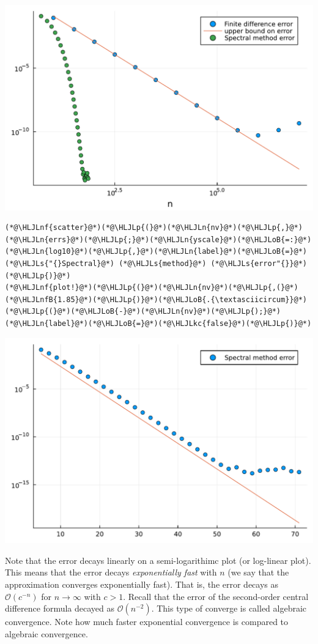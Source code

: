 \documentclass[12pt,a4paper]{article}
\newcommand{\HLJLkc}[1]{\textcolor[RGB]{59,151,46}{\textit{#1}}}
\newcommand{\HLJLn}[1]{#1}
\newcommand{\HLJLnf}[1]{\textcolor[RGB]{66,102,213}{#1}}
\newcommand{\HLJLs}[1]{\textcolor[RGB]{201,61,57}{#1}}
\newcommand{\HLJLnfB}[1]{\textcolor[RGB]{59,151,46}{#1}}
\newcommand{\HLJLoB}[1]{\textcolor[RGB]{102,102,102}{\textbf{#1}}}
\newcommand{\HLJLp}[1]{#1}
\begin{document}
\includegraphics[width=\linewidth]{jl_q9oYGN/Chapter1_4_1.pdf}

\begin{lstlisting}
(*@\HLJLnf{scatter}@*)(*@\HLJLp{(}@*)(*@\HLJLn{nv}@*)(*@\HLJLp{,}@*)(*@\HLJLn{errs}@*)(*@\HLJLp{;}@*)(*@\HLJLn{yscale}@*)(*@\HLJLoB{=:}@*)(*@\HLJLn{log10}@*)(*@\HLJLp{,}@*)(*@\HLJLn{label}@*)(*@\HLJLoB{=}@*)(*@\HLJLs{"{}Spectral}@*) (*@\HLJLs{method}@*) (*@\HLJLs{error"{}}@*)(*@\HLJLp{)}@*)
(*@\HLJLnf{plot!}@*)(*@\HLJLp{(}@*)(*@\HLJLn{nv}@*)(*@\HLJLp{,(}@*)(*@\HLJLnfB{1.85}@*)(*@\HLJLp{)}@*)(*@\HLJLoB{.{\textasciicircum}}@*)(*@\HLJLp{(}@*)(*@\HLJLoB{-}@*)(*@\HLJLn{nv}@*)(*@\HLJLp{);}@*)(*@\HLJLn{label}@*)(*@\HLJLoB{=}@*)(*@\HLJLkc{false}@*)(*@\HLJLp{)}@*)
\end{lstlisting}

\includegraphics[width=\linewidth]{jl_q9oYGN/Chapter1_5_1.pdf}

Note that the error decays linearly on a semi-logarithimc plot (or log-linear plot).  This means that the error decays \emph{exponentially fast} with $n$ (we say that the approximation converges exponentially fast).  That is, the error decays as $\mathcal{O}(c^{-n})$ for $n \to \infty$ with $c > 1$.  Recall that the error of the second-order central difference formula decayed as $\mathcal{O}(n^{-2})$.  This type of converge is  called algebraic convergence.  Note how much faster exponential convergence is compared to algebraic convergence.
\end{document}
